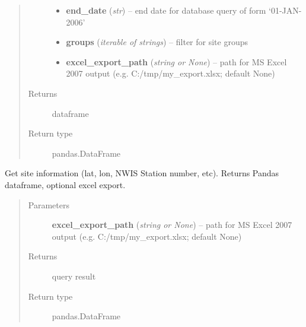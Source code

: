 \documentclass[letterpaper,10pt,english]{sphinxmanual}
\begin{document}
\begin{fulllineitems}
\begin{fulllineitems}
\begin{quote}
\begin{description}
\begin{itemize}
\item {} 
\textbf{end\_date} (\emph{str}) -- end date for database query of form `01-JAN-2006'

\item {} 
\textbf{groups} (\emph{iterable of strings}) -- filter for site groups

\item {} 
\textbf{excel\_export\_path} (\emph{string or None}) -- path for MS Excel 2007 output (e.g. C:/tmp/my\_export.xlsx; default None)

\end{itemize}

\item[{Returns}] \leavevmode
dataframe

\item[{Return type}] \leavevmode
pandas.DataFrame

\end{description}\end{quote}

\end{fulllineitems}


\begin{fulllineitems}
\label{modules:webb_utils.retrieve_data.RetrieveData.get_site_info}
Get site information (lat, lon, NWIS Station number, etc).
Returns Pandas dataframe, optional excel export.
\begin{quote}\begin{description}
\item[{Parameters}] \leavevmode
\textbf{excel\_export\_path} (\emph{string or None}) -- path for MS Excel 2007 output (e.g. C:/tmp/my\_export.xlsx; default None)

\item[{Returns}] \leavevmode
query result

\item[{Return type}] \leavevmode
pandas.DataFrame

\end{description}\end{quote}

\end{fulllineitems}



\end{fulllineitems}
\end{document}
